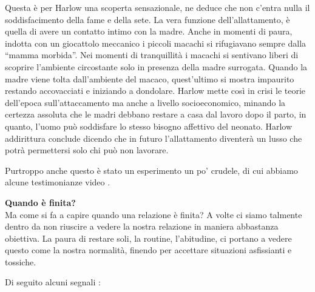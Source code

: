 \documentclass[12pt]{book} %
\begin{document}
\begin{mdframed}[linewidth=1pt]
Questa è per Harlow una scoperta sensazionale, ne deduce che non c'entra nulla il soddisfacimento
della fame e della sete. La vera funzione dell'allattamento, è quella di avere un contatto intimo
con la madre. Anche in momenti di paura, indotta con un giocattolo meccanico i piccoli macachi si rifugiavano sempre
dalla “mamma morbida”. Nei momenti di tranquillità i macachi si sentivano liberi di scoprire
l'ambiente circostante solo in presenza della madre surrogata. Quando la madre viene tolta
dall'ambiente del macaco, quest'ultimo si mostra impaurito restando
accovacciati e iniziando a dondolare. Harlow mette così in crisi le teorie dell'epoca
sull'attaccamento ma anche a livello socioeconomico, minando la certezza assoluta che le madri
debbano restare a casa dal lavoro dopo il parto, in quanto, l'uomo può soddisfare lo stesso
bisogno affettivo del neonato. Harlow addirittura conclude dicendo che in futuro l'allattamento
diventerà un lusso che potrà permettersi solo chi può non lavorare.

Purtroppo anche questo è stato un esperimento un po' crudele, di cui abbiamo alcune testimonianze
video
.
\end{mdframed} 

\noindent \textbf{\large Quando è finita?} \\
Ma come si fa a capire quando una relazione è finita? A volte ci siamo talmente dentro da non riuscire a vedere la nostra relazione in maniera abbastanza 
obiettiva. La paura di restare soli, la routine,
l'abitudine, ci portano a vedere questo come la nostra normalità, finendo per accettare situazioni asfissianti e tossiche. 

\bigskip

Di seguito alcuni segnali :
\end{document}
